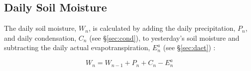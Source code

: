 \subsection{Daily Soil Moisture}
\label{sec:dw}
The daily soil moisture, $W_n$, is calculated by adding the daily precipitation, $P_n$, and daily condensation, $C_n$ (see \S \ref{sec:cond}), to yesterday's soil moisture and subtracting the daily actual evapotranspiration, $E^a_n$ (see \S \ref{sec:daet}) \parencite{cramer88}:

\begin{equation}
\label{eq:dw}
	W_n = W_{n-1} + P_n + C_n - E^a_n
\end{equation}

